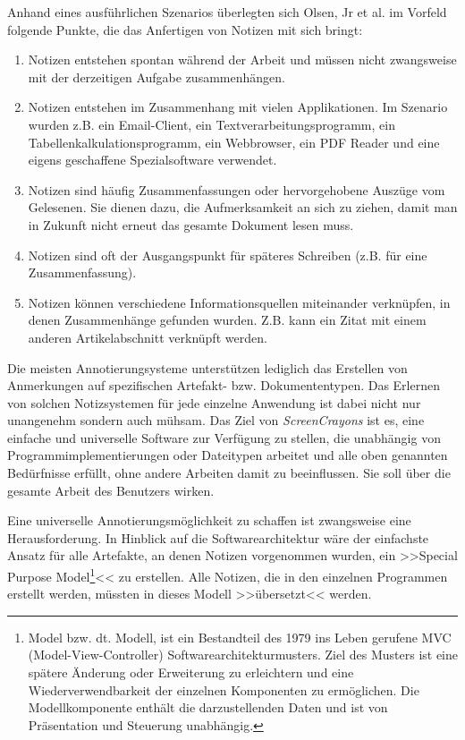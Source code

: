 \medskip {}Anhand eines ausführlichen Szenarios überlegten sich Olsen, Jr et al. im Vorfeld folgende Punkte, die das Anfertigen von Notizen mit sich bringt:

\begin{enumerate}
	\item Notizen entstehen spontan während der Arbeit und müssen nicht zwangsweise mit der derzeitigen Aufgabe zusammenhängen.
	\item Notizen entstehen im Zusammenhang mit vielen Applikationen. Im Szenario wurden z.B. ein Email-Client, ein Textverarbeitungsprogramm, ein Tabellenkalkulationsprogramm, ein Webbrowser, ein \ac{PDF} Reader und eine eigens geschaffene Spezialsoftware verwendet.
	\item Notizen sind häufig Zusammenfassungen oder hervorgehobene Auszüge vom Gelesenen. Sie dienen dazu, die Aufmerksamkeit an sich zu ziehen, damit man in Zukunft nicht erneut das gesamte Dokument lesen muss.
	\item Notizen sind oft der Ausgangspunkt für späteres Schreiben (z.B. für eine Zusammenfassung).
	\item Notizen können verschiedene Informationsquellen miteinander verknüpfen, in denen Zusammenhänge gefunden wurden. Z.B. kann ein Zitat mit einem anderen Artikelabschnitt verknüpft werden.
\end{enumerate}

Die meisten Annotierungsysteme unterstützen lediglich das Erstellen von Anmerkungen auf spezifischen Artefakt- bzw. Dokumententypen. Das Erlernen von solchen Notizsystemen für jede einzelne Anwendung ist dabei nicht nur unangenehm sondern auch mühsam. Das Ziel von \emph{ScreenCrayons} ist es, eine einfache und universelle Software zur Verfügung zu stellen, die unabhängig von Programmimplementierungen oder Dateitypen arbeitet und alle oben genannten Bedürfnisse erfüllt, ohne andere Arbeiten damit zu beeinflussen. Sie soll über die gesamte Arbeit des Benutzers wirken.

\medskip Eine universelle Annotierungsmöglichkeit zu schaffen ist zwangsweise eine Herausforderung. In Hinblick auf die Softwarearchitektur wäre der einfachste Ansatz für alle Artefakte, an denen Notizen vorgenommen wurden, ein >>Special Purpose Model\footnote{Model bzw. dt. Modell, ist ein Bestandteil des 1979 ins Leben gerufene MVC (Model-View-Controller) Softwarearchitekturmusters. Ziel des Musters ist eine spätere Änderung oder Erweiterung zu erleichtern und eine Wiederverwendbarkeit der einzelnen Komponenten zu ermöglichen. Die Modellkomponente enthält die darzustellenden Daten und ist von Präsentation und Steuerung unabhängig.}<< zu erstellen. Alle Notizen, die in den einzelnen Programmen erstellt werden, müssten in dieses Modell >>übersetzt<< werden. 

